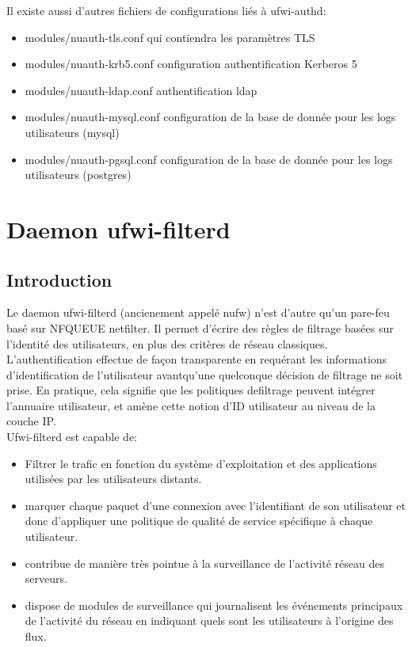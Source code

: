 \documentclass[12pt]{report}
\begin{document}
Il existe aussi d'autres fichiers de configurations liés à ufwi-authd:
\begin{itemize}
  \item modules/nuauth-tls.conf qui contiendra les paramètres TLS
  \item modules/nuauth-krb5.conf configuration authentification Kerberos 5
  \item modules/nuauth-ldap.conf authentification ldap
  \item modules/nuauth-mysql.conf configuration de la base de donnée pour les logs utilisateurs (mysql)
  \item modules/nuauth-pgsql.conf configuration de la base de donnée pour les logs utilisateurs (postgres) 
\end{itemize}
 
\chapter{Daemon ufwi-filterd}
\section{Introduction}

	Le daemon ufwi-filterd (ancienement appelé nufw) n'est d'autre qu'un pare-feu basé sur NFQUEUE netfilter. Il permet d'écrire des règles de filtrage basées sur l'identité des utilisateurs, en plus des critères de réseau classiques. L'authentification effectue de façon transparente en requérant les informations d’identification de l’utilisateur avantqu’une quelconque décision de filtrage ne soit prise. En pratique, cela signifie que les politiques defiltrage peuvent intégrer l’annuaire utilisateur, et amène cette notion d’ID utilisateur au niveau de la couche IP.\\
Ufwi-filterd est capable de:
\begin{itemize}
  \item Filtrer le trafic en fonction du système d’exploitation et des applications utilisées par les utilisateurs
     distants.
  \item marquer chaque paquet d'une connexion avec l'identifiant de son utilisateur et donc d'appliquer une politique de qualité de service spécifique à chaque utilisateur. 
  \item contribue de manière très pointue à la surveillance de l'activité réseau des serveurs.
  \item dispose de modules de surveillance qui journalisent les événements principaux de l'activité du réseau en indiquant quels sont les utilisateurs à l'origine des flux.
\end{itemize}
\end{document}
